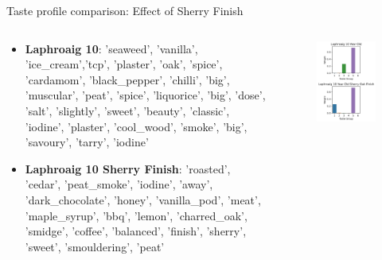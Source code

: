\documentclass{beamer}
\begin{document}
	\begin{frame}{Taste profile comparison: Effect of Sherry Finish}
	\fontsize{8pt}{8pt}\selectfont
	
	\begin{columns}
		\begin{column}{0.4\textwidth}
			\begin{itemize}
				\item \textbf{Laphroaig 10}: 'seaweed', 'vanilla', 'ice\_cream','tcp', 'plaster', 'oak', 'spice', 'cardamom', 'black\_pepper', 'chilli', 'big', 'muscular', 'peat', 'spice', 'liquorice', 'big', 'dose', 'salt', 'slightly', 'sweet', 'beauty', 'classic', 'iodine', 'plaster', 'cool\_wood', 'smoke', 'big', 'savoury', 'tarry', 'iodine'
				
				\item \textbf{Laphroaig 10 Sherry Finish}: 'roasted', 'cedar', 'peat\_smoke', 'iodine', 'away', 'dark\_chocolate', 'honey', 'vanilla\_pod', 'meat', 'maple\_syrup', 'bbq', 'lemon', 'charred\_oak', 'smidge', 'coffee', 'balanced', 'finish', 'sherry', 'sweet', 'smouldering', 'peat'
			\end{itemize}
		\end{column}
		\begin{column}{0.6\textwidth}
			\begin{figure}[H]
				\begin{center}
					\includegraphics[scale = 0.5]{islaysherrying_comptopics}

\end{center}
\end{figure}
\end{column}
\end{columns}
\end{frame}
\end{document}
